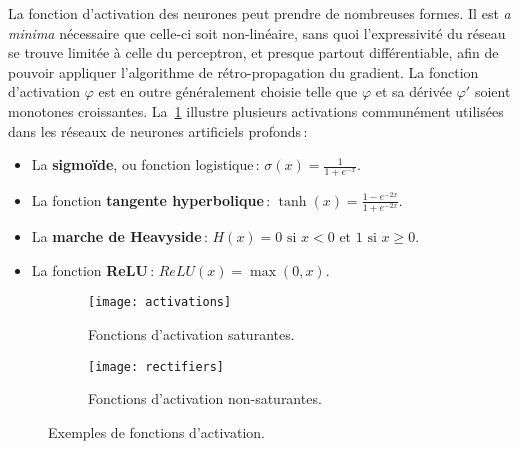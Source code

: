 La fonction d'activation des neurones peut prendre de nombreuses formes. Il est \emph{a minima} nécessaire que celle-ci soit non-linéaire, sans quoi l'expressivité du réseau se trouve limitée à celle du perceptron, et presque partout différentiable, afin de pouvoir appliquer l'algorithme de rétro-propagation du gradient. La fonction d'activation $\varphi$ est en outre généralement choisie telle que $\varphi$ et sa dérivée $\varphi'$ soient monotones croissantes. La~\cref{fig:saturantes} illustre plusieurs activations communément utilisées dans les réseaux de neurones artificiels profonds\,:
\begin{itemize}
  \item La \textbf{sigmoïde}, ou fonction logistique\,: $\sigma(x) = \frac{1}{1 + e^{-x}}$.
  \item La fonction \textbf{tangente hyperbolique}\,: $\tanh(x) = \frac{1 - e^{-2x}}{1 + e^{-2x}}$.
  \item La \textbf{marche de Heavyside}\,: $H(x) = 0 \text{ si } x < 0 \text{ et } 1 \text{ si } x \geq 0$.
  \item La fonction \textbf{\gls{ReLU}}\,: $ReLU(x) = \max(0,x)$.
\end{itemize}

\begin{figure}[t]
  \begin{subfigure}[b]{0.5\textwidth}
    \texttt{[image: activations]}
    \caption{Fonctions d'activation saturantes.}
    \label{fig:saturantes}
  \end{subfigure}
\begin{subfigure}[b]{0.5\textwidth}
  \texttt{[image: rectifiers]}
  \caption{Fonctions d'activation non-saturantes.}
  \label{fig:rectifiers}
\end{subfigure}
\caption{Exemples de fonctions d'activation.}
\label{fig:activations}
\end{figure}

